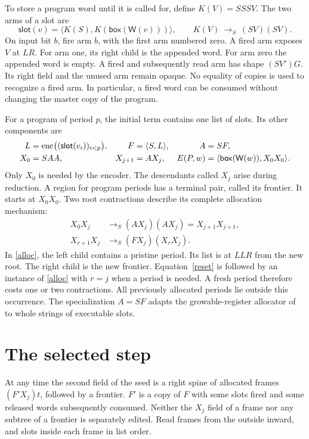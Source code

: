 \documentclass[11pt,letterpaper,oneside,reqno]{amsart}
\newcommand{\pair}[2]{\langle #1,#2\rangle}
\newcommand{\word}{\mathsf W}
\newcommand{\bx}[1]{\mathsf{box}(#1)}
\newcommand{\slot}{\mathsf{slot}}
\newcommand{\Rule}{\longrightarrow_S}
\begin{document}
To store a program word until it is called for, define \(K(V)=SSSV\). The two arms of a slot are
\begin{equation}
 \slot(v)=\pair{K(S)}{K(\bx{\word(v)})},\qquad
 K(V)\ \Rule\ (SV)(SV).                                      \label{commit}
\end{equation}
On input bit \(b\), fire arm \(b\), with the first arm numbered zero. A fired arm exposes \(V\) at \(LR\). For arm one, its right child is the appended word. For arm zero the appended word is empty. A fired and subsequently read arm has shape \((SV')G\). Its right field and the unused arm remain opaque. No equality of copies is used to recognize a fired arm. In particular, a fired word can be consumed without changing the master copy of the program.

For a program of period \(p\), the initial term contains one list of slots. Its other components are
\begin{align}
 L&=\operatorname{enc}\bigl((\slot(v_i))_{i<p}\bigr),&
 F&=\pair{S}{L},& A&=SF, \notag\\
 X_0&=SAA,& X_{j+1}&=A X_j,&
 E(P,w)&=\pair{\bx{\word(w)}}{X_0X_0}.                             \label{seed}
\end{align}
Only \(X_0\) is needed by the encoder. The descendants called \(X_j\) arise during reduction. A region for program periods has a terminal pair, called its frontier. It starts at \(X_0X_0\). Two root contractions describe its complete allocation mechanism:
\begin{align}
 X_0X_j &\Rule (A X_j)(A X_j)=X_{j+1}X_{j+1},                 \label{reset}\\
 X_{r+1}X_j &\Rule (F X_j)(X_rX_j).                           \label{alloc}
\end{align}
In \eqref{alloc}, the left child contains a pristine period. Its list is at \(LLR\) from the new root. The right child is the new frontier. Equation~\eqref{reset} is followed by an instance of \eqref{alloc} with \(r=j\) when a period is needed. A fresh period therefore costs one or two contractions. All previously allocated periods lie outside this occurrence. The specialization \(A=SF\) adapts the growable-register allocator of~\cite{five} to whole strings of executable slots.

\section{The selected step}
At any time the second field of the seed is a right spine of allocated frames
\((F'X_j)t\), followed by a frontier. \(F'\) is a copy of \(F\) with some slots fired and some released words subsequently consumed. Neither the \(X_j\) field of a frame nor any subtree of a frontier is separately edited. Read frames from the outside inward, and slots inside each frame in list order.
\end{document}
